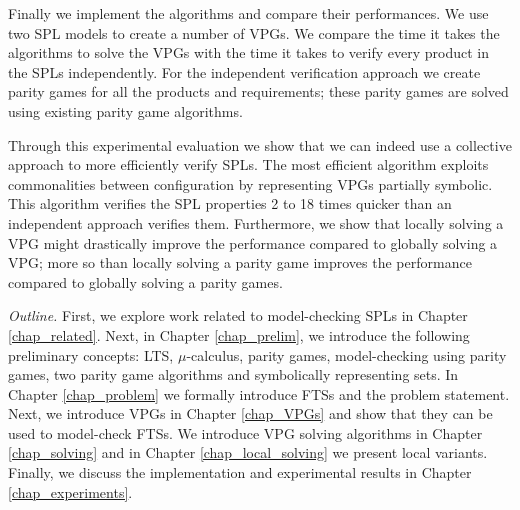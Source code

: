 Finally we implement the algorithms and compare their performances. We use two SPL models to create a number of VPGs. We compare the time it takes the algorithms to solve the VPGs with the time it takes to verify every product in the SPLs independently. For the independent verification approach we create parity games for all the products and requirements; these parity games are solved using existing parity game algorithms.

Through this experimental evaluation we show that we can indeed use a collective approach to more efficiently verify SPLs. The most efficient algorithm exploits commonalities between configuration by representing VPGs partially symbolic. This algorithm verifies the SPL properties 2 to 18 times quicker than an independent approach verifies them. Furthermore, we show that locally solving a VPG might drastically improve the performance compared to globally solving a VPG; more so than locally solving a parity game improves the performance compared to globally solving a parity games.

\textit{Outline.} First, we explore work related to model-checking SPLs in Chapter \ref{chap_related}. Next, in Chapter \ref{chap_prelim}, we introduce the following preliminary concepts: LTS, $\mu$-calculus, parity games, model-checking using parity games, two parity game algorithms and symbolically representing sets. In Chapter \ref{chap_problem} we formally introduce FTSs and the problem statement. Next, we introduce VPGs in Chapter \ref{chap_VPGs} and show that they can be used to model-check FTSs. We introduce VPG solving algorithms in Chapter \ref{chap_solving} and in Chapter \ref{chap_local_solving} we present local variants. Finally, we discuss the implementation and experimental results in Chapter \ref{chap_experiments}.